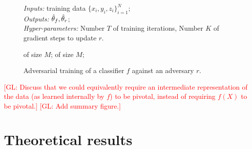 \documentclass[twocolumn,superscriptaddress,aps]{revtex4-1}
\newcommand{\glnote}[1]{\textcolor{red}{[GL: #1]}}
\theoremstyle{plain}
\begin{document}
\begin{figure*}
    \begin{minipage}{\linewidth}
    \begin{algorithm}[H]
    \caption{Adversarial training of a classifier $f$ against an adversary $r$.}

    \begin{flushleft}
        {\it Inputs:} training data $\{ x_i, y_i, z_i \}_{i=1}^N$;\\
        {\it Outputs:} $\smash{\hat\theta_f}, \smash{\hat\theta_r}$;\\
        {\it Hyper-parameters:} Number $T$ of training iterations,
                                Number $K$ of gradient steps to update $r$.
    \end{flushleft}

    \label{alg:adversarial-training}
    \begin{algorithmic}[1]
             
                 of size $M$;
            \EndFor
             of size $M$; 
        \EndFor
    \end{algorithmic}
    \end{algorithm}
    \end{minipage}
\end{figure*}

\glnote{Discuss that we could equivalently require an intermediate representation of the data (as learned internally by $f$) to be pivotal, instead of requiring $f(X)$ to be pivotal.}
\glnote{Add summary figure.}



\section{Theoretical results}
\label{sec:theory}
\end{document}
